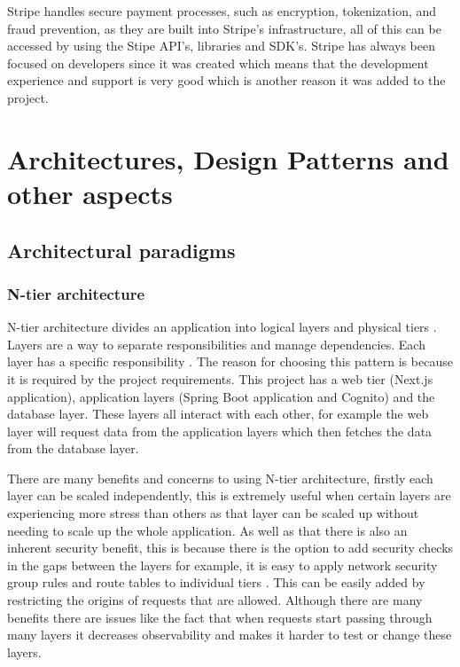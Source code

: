 \documentclass[]{project_report}
\begin{document}
Stripe handles secure payment processes, such as encryption, tokenization, and fraud prevention, as they are built into Stripe’s infrastructure, all of this can be accessed by using the Stipe API's, libraries and SDK's. Stripe has always been focused on developers since it was created which means that the development experience and support is very good which is another reason it was added to the project.


\chapter{Architectures, Design Patterns and other aspects}

\section{Architectural paradigms}

\subsection{N-tier architecture}

N-tier architecture divides an application into logical layers and physical tiers \cite{n_tier_architecture}. Layers are a way to separate responsibilities and manage dependencies. Each layer has a specific responsibility \cite{n_tier_architecture}. The reason for choosing this pattern is because it is required by the project requirements. This project has a web tier (Next.js application), application layers (Spring Boot application and Cognito) and the database layer. These layers all interact with each other, for example the web layer will request data from the application layers which then fetches the data from the database layer. 

There are many benefits and concerns to using N-tier architecture, firstly each layer can be scaled independently, this is extremely useful when certain layers are experiencing more stress than others as that layer can be scaled up without needing to scale up the whole application. As well as that there is also an inherent security benefit, this is because there is the option to add security checks in the gaps between the layers for example, it is easy to apply network security group rules and route tables to individual tiers \cite{n_tier_architecture}. This can be easily added by restricting the origins of requests that are allowed. Although there are many benefits there are issues like the fact that when requests start passing through many layers it decreases observability and makes it harder to test or change these layers.
\end{document}
